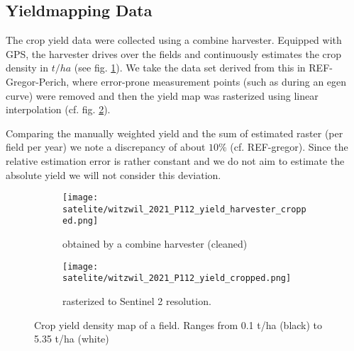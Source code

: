 	\subsection{Yieldmapping Data}{
		\label{sec:yieldmapping_data}
		The crop yield data were collected using a combine harvester. Equipped with GPS, the harvester drives over the fields and continuously estimates the crop density in $t/ha$ (see fig. \ref{fig:satelite/witzwil_2021_P112_yield_harvester_cropped}). 
		We take the data set derived from this in REF-Gregor-Perich, where error-prone measurement points (such as during an egen curve) were removed and then the yield map was rasterized using linear interpolation (cf. fig. \ref{fig:satelite/witzwil_2021_P112_yield_cropped.png}).    

		
		Comparing the manually weighted yield and the sum of estimated raster (per field per year) we note a discrepancy of about $10\%$ (cf. REF-gregor). Since the relative estimation error is rather constant and we do not aim to estimate the absolute yield we will not consider this deviation.
		\begin{figure}
			\centering
			\begin{subfigure}{.5\textwidth}
			  \centering
			  \texttt{[image: satelite/witzwil\_2021\_P112\_yield\_harvester\_cropped.png]}
			  \caption{obtained by a combine harvester (cleaned)}
			  \label{fig:satelite/witzwil_2021_P112_yield_harvester_cropped}
			\end{subfigure}%
			\begin{subfigure}{.5\textwidth}
				\centering
				\texttt{[image: satelite/witzwil\_2021\_P112\_yield\_cropped.png]}
			  \caption{rasterized to Sentinel 2 resolution.}
			  \label{fig:satelite/witzwil_2021_P112_yield_cropped.png}
			\end{subfigure}
			\caption{Crop yield density map of a field. Ranges from 0.1 t/ha (black) to 5.35 t/ha (white) }
			\label{fig:satelite_witzwil_yield}
		\end{figure}
	}


